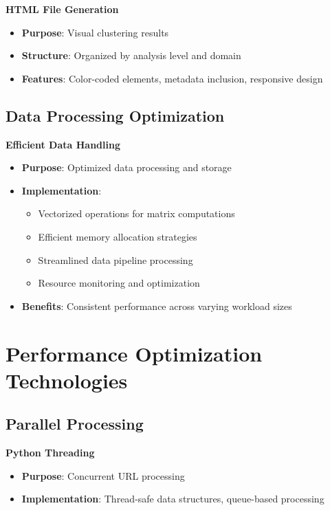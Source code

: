 \textbf{HTML File Generation}
\begin{itemize}
    \item \textbf{Purpose}: Visual clustering results
    \item \textbf{Structure}: Organized by analysis level and domain
    \item \textbf{Features}: Color-coded elements, metadata inclusion, responsive design
\end{itemize}

\subsection{Data Processing Optimization}
\label{subsec:data-optimization}

\textbf{Efficient Data Handling}
\begin{itemize}
    \item \textbf{Purpose}: Optimized data processing and storage
    \item \textbf{Implementation}:
        \begin{itemize}
            \item Vectorized operations for matrix computations
            \item Efficient memory allocation strategies
            \item Streamlined data pipeline processing
            \item Resource monitoring and optimization
        \end{itemize}
    \item \textbf{Benefits}: Consistent performance across varying workload sizes
\end{itemize}

\section{Performance Optimization Technologies}
\label{sec:performance-tech}

\subsection{Parallel Processing}
\label{subsec:parallel-processing}

\textbf{Python Threading}
\begin{itemize}
    \item \textbf{Purpose}: Concurrent URL processing
    \item \textbf{Implementation}: Thread-safe data structures, queue-based processing
\end{itemize}

